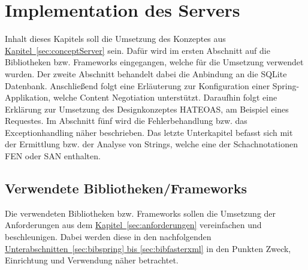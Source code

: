 
\chapter{Implementation des Servers}
Inhalt dieses Kapitels soll die Umsetzung des Konzeptes aus \hyperref[sec:conceptServer]{Kapitel~\ref{sec:conceptServer}} sein. Dafür wird im ersten Abschnitt auf die Bibliotheken bzw. Frameworks eingegangen, welche für die Umsetzung verwendet wurden. Der zweite Abschnitt behandelt dabei die Anbindung an die SQLite Datenbank. Anschließend folgt eine Erläuterung zur Konfiguration einer Spring-Applikation, welche Content Negotiation unterstützt. Daraufhin folgt eine Erklärung zur Umsetzung des Designkonzeptes HATEOAS, am Beispiel eines Requestes. Im Abschnitt fünf wird die Fehlerbehandlung bzw. das Exceptionhandling näher beschrieben. Das letzte Unterkapitel befasst sich mit der Ermittlung bzw. der Analyse von Strings, welche eine der Schachnotationen \gls{FEN} oder \gls{SAN} enthalten.

\section{Verwendete Bibliotheken/Frameworks}
Die verwendeten Bibliotheken bzw. Frameworks sollen die Umsetzung der Anforderungen aus dem \hyperref[sec:anforderungen]{Kapitel~\ref{sec:anforderungen}} vereinfachen und beschleunigen. Dabei werden diese in den nachfolgenden \hyperref[sec:bibspring, sec:bibfasterxml]{Unterabschnitten~\ref{sec:bibspring} bis \ref{sec:bibfasterxml}} in den Punkten Zweck, Einrichtung und Verwendung näher betrachtet. 

